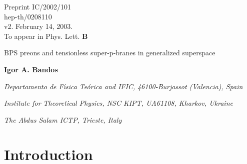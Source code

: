 \documentclass[a4paper,11pt]{article}
\begin{document}
\begin{flushright}
Preprint IC/2002/101 \\ 
hep-th/0208110 \\ 
v2. February 14, 2003. \\ 
To appear in Phys. Lett. {\bf B} 
\end{flushright}

\begin{center}
{\Large
BPS preons and tensionless super-p-branes in generalized superspace} 

\bigskip 

{\bf Igor A. Bandos} 

\bigskip 

{\it Departamento de F\'{\i}sica Te\'orica and IFIC,} 
{\it  46100-Burjassot (Valencia), Spain}

{\it Institute for Theoretical Physics, NSC KIPT, 
UA61108, Kharkov, Ukraine} 

{\it The Abdus Salam ICTP, Trieste, Italy} 

\medskip 





\end{center}


\begin{abstract} 
\noindent
Tensionless super--p--branes in a generalized superspace with 
additional tensorial central charge coordinates may provide 
an extended object model for BPS preons, {\it i.e.} 
for the hypothetical constituents of M--theory preserving 31 of 32 
supersymmetries 
\cite{BPS01}.
   

\end{abstract}


\section{Introduction} 
 
\end{document}
